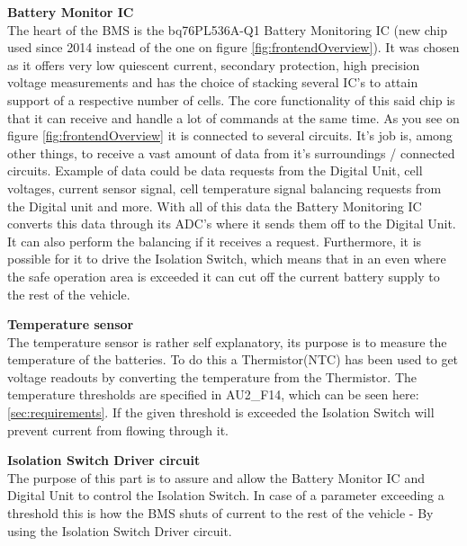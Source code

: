 \textbf{Battery Monitor IC}\\
The heart of the BMS is the bq76PL536A-Q1 Battery Monitoring IC (new chip used since 2014 instead of the one on figure \ref{fig:frontendOverview}). It was chosen as it offers very low quiescent current, secondary protection, high precision voltage measurements and has the choice of stacking several IC's to attain support of a respective number of cells. The core functionality of this said chip is that it can receive and handle a lot of commands at the same time. As you see on figure \ref{fig:frontendOverview} it is connected to several circuits. It's job is, among other things, to receive a vast amount of data from it's surroundings / connected circuits. Example of data could be data requests from the Digital Unit, cell voltages, current sensor signal, cell temperature signal balancing requests from the Digital unit and more. With all of this data the Battery Monitoring IC converts this data through its ADC's where it sends them off to the Digital Unit. It can also perform the balancing if it receives a request. Furthermore, it is possible for it to drive the Isolation Switch, which means that in an even where the safe operation area is exceeded it can cut off the current battery supply to the rest of the vehicle.

\textbf{Temperature sensor}\\ 
The temperature sensor is rather self explanatory, its purpose is to measure the temperature of the batteries. To do this a Thermistor(NTC) has been used to get voltage readouts by converting the temperature from the Thermistor. The temperature thresholds are specified in AU2\_F14, which can be seen here: \ref{sec:requirements}. If the given threshold is exceeded the Isolation Switch will prevent current from flowing through it.

\textbf{Isolation Switch Driver circuit}\\
The purpose of this part is to assure and allow the Battery Monitor IC and Digital Unit to control the Isolation Switch. In case of a parameter exceeding a threshold this is how the BMS shuts of current to the rest of the vehicle - By using the Isolation Switch Driver circuit.\\

